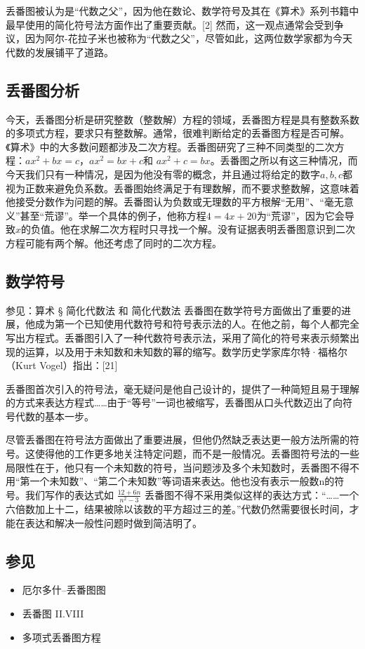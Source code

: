 丢番图被认为是“代数之父”，因为他在数论、数学符号及其在《算术》系列书籍中最早使用的简化符号法方面作出了重要贡献。[2] 然而，这一观点通常会受到争议，因为阿尔-花拉子米也被称为“代数之父”，尽管如此，这两位数学家都为今天代数的发展铺平了道路。
\subsection{丢番图分析}    
今天，丢番图分析是研究整数（整数解）方程的领域，丢番图方程是具有整数系数的多项式方程，要求只有整数解。通常，很难判断给定的丢番图方程是否可解。《算术》中的大多数问题都涉及二次方程。丢番图研究了三种不同类型的二次方程：\(ax^2+bx=c\)，\(ax^2=bx+c\)和 \(ax^2+c=bx\)。丢番图之所以有这三种情况，而今天我们只有一种情况，是因为他没有零的概念，并且通过将给定的数字\(a,b,c\)都视为正数来避免负系数。丢番图始终满足于有理数解，而不要求整数解，这意味着他接受分数作为问题的解。丢番图认为负数或无理数的平方根解“无用”、“毫无意义”甚至“荒谬”。举一个具体的例子，他称方程\(4=4x+20\)为“荒谬”，因为它会导致\(x\)的负值。他在求解二次方程时只寻找一个解。没有证据表明丢番图意识到二次方程可能有两个解。他还考虑了同时的二次方程。
\subsection{数学符号}  
参见：算术 § 简化代数法 和 简化代数法  
丢番图在数学符号方面做出了重要的进展，他成为第一个已知使用代数符号和符号表示法的人。在他之前，每个人都完全写出方程式。丢番图引入了一种代数符号表示法，采用了简化的符号来表示频繁出现的运算，以及用于未知数和未知数的幂的缩写。数学历史学家库尔特·福格尔（Kurt Vogel）指出：[21]

丢番图首次引入的符号法，毫无疑问是他自己设计的，提供了一种简短且易于理解的方式来表达方程式……由于“等号”一词也被缩写，丢番图从口头代数迈出了向符号代数的基本一步。

尽管丢番图在符号法方面做出了重要进展，但他仍然缺乏表达更一般方法所需的符号。这使得他的工作更多地关注特定问题，而不是一般情况。丢番图符号法的一些局限性在于，他只有一个未知数的符号，当问题涉及多个未知数时，丢番图不得不用“第一个未知数”、“第二个未知数”等词语来表达。他也没有表示一般数n的符号。我们写作的表达式如 \(\frac{12+6n}{n^2-3}\) 丢番图不得不采用类似这样的表达方式：“……一个六倍数加上十二，结果被除以该数的平方超过三的差。”代数仍然需要很长时间，才能在表达和解决一般性问题时做到简洁明了。
\subsection{参见}  
\begin{itemize}
\item 厄尔多什–丢番图图  
\item 丢番图 II.VIII  
\item 多项式丢番图方程
\end{itemize}
